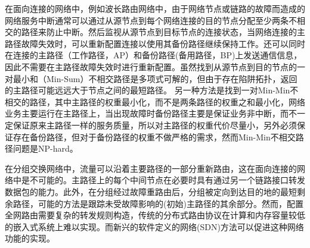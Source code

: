 在面向连接的网络中，例如波长路由网络中，由于网络节点或链路的故障而造成的网络服务中断通常可以通过从源节点到每个网络连接的目的节点分配至少两条不相交的路径来防止中断\cite{kuipers2012overview}。然后监视从源节点到目标节点的连接状态，当网络连接的主路径故障失效时，可以重新配置连接以使用其备份路径继续保持工作。还可以同时在连接的主路径（工作路径，AP）和备份路径(备用路径，BP)上发送通信信息，因此不需要在主路径故障失效时进行重新配置。虽然找到从源节点到目的节点的一对最小和（Min-Sum）不相交路径是多项式可解的\cite{suurballe1974disjoint,suurballe1984quick}，但由于存在陷阱拓扑\cite{dunn1994comparison}，返回的主路径可能远远大于节点之间的最短路径\cite{dunn1994comparison}。 另一种方法是找到一对Min-Min不相交的路径，其中主路径的权重最小化，而不是两条路径的权重之和最小化，网络业务主要运行在主路径上，当出现故障时备份路径主要是保证业务非中断，而不一定保证原来主路径一样的服务质量，所以对主路径的权重代价尽量小，另外必须保证存在备份路径，但对于备份路径的权重不做严格的需求，然而Min-Min不相交路径问题是NP-hard\cite{guo2013finding}。%




在分组交换网络中，流量可以沿着主要路径的一部分重新路由，这在面向连接的网络中是不可能的。主路径上的每个中间节点在必要时具有通过另一个链路接口转发数据包的能力。此外，在分组经过故障重路由后，分组被定向到达目的地的最短剩余路径，可能的方法是跟踪未受故障影响的(初始)主路径的其余部分。然而，配置全网路由需要复杂的转发规则构造，传统的分布式路由协议在计算和内存容量较低的嵌入式系统上难以实现。而新兴的软件定义的网络(SDN)方法可以促进这种网络功能的实现。






